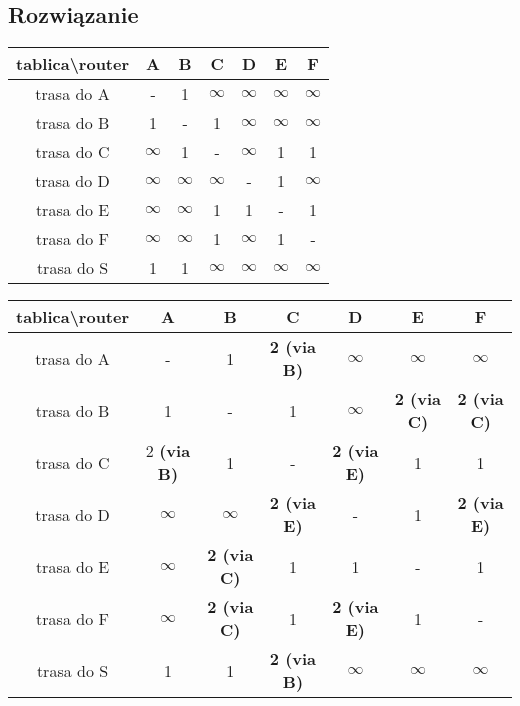 \documentclass[a4paper]{article}
\begin{document}
\subsection{Rozwiązanie}
\begin{center}
\begin{tabular}{ |c|c|c|c|c|c|c| } 
 \hline
 tablica\textbackslash router & A & B & C & D & E & F \\ 
 \hline
 trasa do A & - & 1 & $\infty$ & $\infty$ & $\infty$ & $\infty$  \\ 
 \hline
 trasa do B & 1 & - & 1 & $\infty$ & $\infty$ & $\infty$ \\ 
 \hline
 trasa do C & $\infty$ & 1 & - & $\infty$ & 1 & 1 \\ 
 \hline
 trasa do D & $\infty$ & $\infty$ & $\infty$ & - & 1 & $\infty$ \\ 
 \hline
 trasa do E & $\infty$ & $\infty$ & 1 & 1 & - & 1 \\ 
 \hline
 trasa do F & $\infty$ & $\infty$ & 1 & $\infty$ & 1 & - \\ 
 \hline
 trasa do S & 1 & 1 & $\infty$ & $\infty$ & $\infty$ & $\infty$ \\ 
 \hline
\end{tabular}
\end{center}

\begin{center}
\begin{tabular}{ |c|c|c|c|c|c|c| } 
 \hline
 tablica\textbackslash router & A & B & C & D & E & F \\ 
 \hline
 trasa do A & - & 1 & \textbf{2 (via B)} & $\infty$ & $\infty$ & $\infty$  \\ 
 \hline
 trasa do B & 1 & - & 1 & $\infty$ & \textbf{2 (via C)} & \textbf{2 (via C)} \\ 
 \hline
 trasa do C & 2 \textbf{(via B)} & 1 & - & \textbf{2 (via E)} & 1 & 1 \\ 
 \hline
 trasa do D & $\infty$ & $\infty$ & \textbf{2 (via E)} & - & 1 & \textbf{2 (via E)} \\ 
 \hline
 trasa do E & $\infty$ & \textbf{2 (via C)} & 1 & 1 & - & 1 \\ 
 \hline
 trasa do F & $\infty$ & \textbf{2 (via C)} & 1 & \textbf{2 (via E)} & 1 & - \\ 
 \hline
 trasa do S & 1 & 1 & \textbf{2 (via B)} & $\infty$ & $\infty$ & $\infty$ \\ 
 \hline
\end{tabular}
\end{center}
\end{document}
